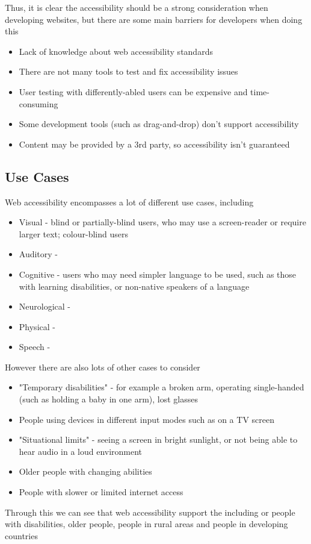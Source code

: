 \documentclass{article}
\begin{document}
Thus, it is clear the accessibility should be a strong consideration when developing websites, but there are some main barriers for developers when doing this

\begin{itemize}
    \item Lack of knowledge about web accessibility standards
    \item There are not many tools to test and fix accessibility issues
    \item User testing with differently-abled users can be expensive and time-consuming
    \item Some development tools (such as drag-and-drop) don't support accessibility
    \item Content may be provided by a 3rd party, so accessibility isn't guaranteed
\end{itemize}

\subsection{Use Cases}
%
Web accessibility encompasses a lot of different use cases, including
%
\begin{itemize}
    \item Visual - blind or partially-blind users, who may use a screen-reader or require larger text; colour-blind users
    \item Auditory - 
    \item Cognitive - users who may need simpler language to be used, such as those with learning disabilities, or non-native speakers of a language
    \item Neurological - 
    \item Physical - 
    \item Speech - 
\end{itemize}
%
However there are also lots of other cases to consider \cite{WAIaccessibilityintro}
%
\begin{itemize}
    \item "Temporary disabilities" - for example a broken arm, operating single-handed (such as holding a baby in one arm), lost glasses
    \item People using devices in different input modes such as on a TV screen
    \item "Situational limits" - seeing a screen in bright sunlight, or not being able to hear audio in a loud environment
    \item Older people with changing abilities
    \item People with slower or limited internet access
\end{itemize}
%
Through this we can see that web accessibility support the including or people with disabilities, older people, people in rural areas and people in developing countries
%
\end{document}
